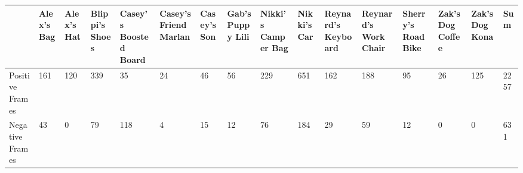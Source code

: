\begin{tabularx}{\textwidth}{|X|X|X|X|X|X|X|X|X|X|X|X|X|X|X|X|}
\hline
\tiny
 & Alex's Bag & Alex's Hat & Blippi's Shoes & Casey's Boosted Board & Casey's Friend Marlan & Casey's Son & Gab's Puppy Lili & Nikki's Camper Bag & Nikki's Car & Reynard's Keyboard & Reynard's Work Chair & Sherry's Road Bike & Zak's Dog Coffee & Zak's Dog Kona & Sum \\ \hline
Positive Frames & 161 & 120 & 339 & 35 & 24 & 46 & 56 & 229 & 651 & 162 & 188 & 95 & 26 & 125 & 2257 \\ \hline
Negative Frames & 43 & 0 & 79 & 118 & 4 & 15 & 12 & 76 & 184 & 29 & 59 & 12 & 0 & 0 & 631 \\ \hline
\end{tabularx}